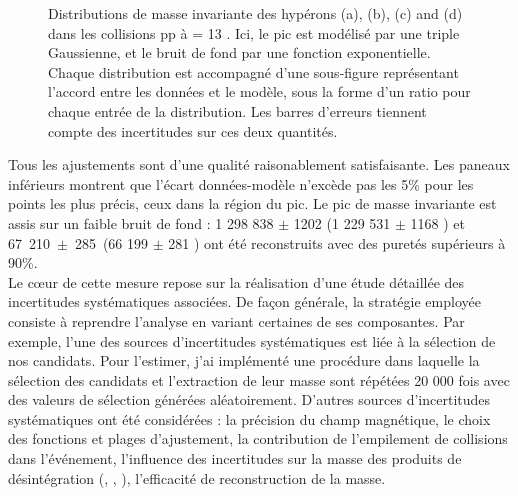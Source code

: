 \begin{figure}[!p]
{	\label{fig:OmegaMinus_TripleGaussian}
} 
\caption{Distributions de masse invariante des hypérons \rmXiM (a), \rmAxiP (b), \rmOmegaM (c) and \rmAomegaP (d) dans les collisions pp à \sqrtS = 13 \tev. Ici, le pic est modélisé par une triple Gaussienne, et le bruit de fond par une fonction exponentielle. Chaque distribution est accompagné d'une sous-figure représentant l'accord entre les données et le modèle, sous la forme d'un ratio pour chaque entrée de la distribution. Les barres d'erreurs tiennent compte des incertitudes sur ces deux quantités.}
	\label{fig:InvMassCascades}
\end{figure}

Tous les ajustements sont d'une qualité raisonablement satisfaisante. Les paneaux inférieurs montrent que l'écart données-modèle  n'excède pas les 5\% pour les points les plus précis, \ie ceux dans la région du pic. Le pic de masse invariante est assis sur un faible bruit de fond : 1 298 838 $\pm$ 1202 \rmXiM (1 229 531 $\pm$ 1168 \rmAxiP ) et 67~210~$\pm$~285~\rmOmegaM (66 199 $\pm$ 281 \rmAomegaP) ont été reconstruits avec des puretés supérieurs à 90\%.\\

Le c\oe{}ur de cette mesure repose sur la réalisation d’une étude détaillée des incertitudes systématiques associées. De façon générale, la stratégie employée consiste à reprendre l’analyse en variant certaines de ses composantes. Par exemple, l’une des sources d’incertitudes systématiques est liée à la sélection de nos candidats. Pour l’estimer, j’ai implémenté une procédure dans laquelle la sélection des candidats et l’extraction de leur masse sont répétées 20 000 fois avec des valeurs de sélection générées aléatoirement. D’autres sources d’incertitudes systématiques ont été considérées : la précision du champ magnétique, le choix des fonctions et plages d’ajustement, la contribution de l’empilement de collisions dans l’événement, l’influence des incertitudes sur la masse des produits de désintégration (\rmLambda, \rmPiPM, \rmKPM), l’efficacité de reconstruction de la masse. 

